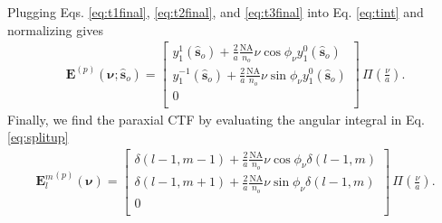 \documentclass[11pt]{article}
\providecommand{\mb}[1]{\mathbf{#1}}
\providecommand{\so}[1]{\mathbf{\hat{s}}_o}
\providecommand{\bs}[1]{\boldsymbol{#1}}
\begin{document}
Plugging Eqs. \ref{eq:t1final}, \ref{eq:t2final}, and \ref{eq:t3final} into Eq.
\ref{eq:tint} and normalizing gives
\begin{align}
  {\mb{E}}^{(p)}(\bs{\nu}; \so{}) =
\begin{bmatrix}
  y_1^1(\so{}) + \frac{2}{a}\frac{\text{NA}}{n_o}\nu\cos\phi_\nu y_1^0(\so{})\\
  y_1^{-1}(\so{}) + \frac{2}{a}\frac{\text{NA}}{n_o}\nu\sin\phi_\nu y_1^0(\so{})\\
  0\\
  \end{bmatrix}\, \Pi\left(\frac{\nu}{a}\right). \label{eq:paractfsp}
\end{align}
Finally, we find the paraxial CTF by evaluating the angular integral in Eq.
\ref{eq:splitup} 
\begin{align}
  {\mb{E}_l^m}^{(p)}(\bs{\nu}) =
\begin{bmatrix}
  \delta(l-1, m-1) + \frac{2}{a}\frac{\text{NA}}{n_o}\nu\cos\phi_\nu\delta(l-1, m)\\
  \delta(l-1, m+1) + \frac{2}{a}\frac{\text{NA}}{n_o}\nu\sin\phi_\nu\delta(l-1, m)\\
  0\\
  \end{bmatrix}\, \Pi\left(\frac{\nu}{a}\right).
\end{align}
\end{document}
